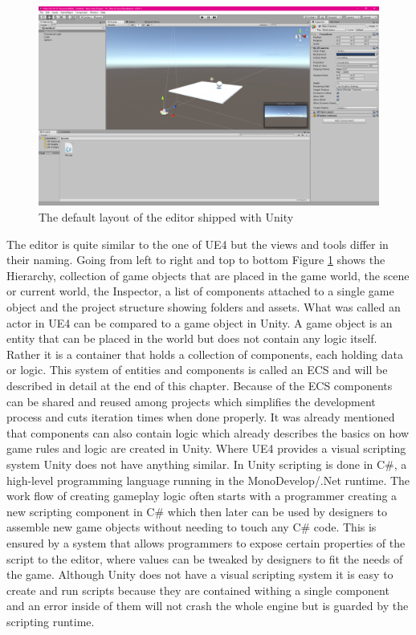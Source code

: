 \begin{figure}[h!]
	\includegraphics[width=\linewidth]{PICs/unity_ed.png}
	\caption{The default layout of the editor shipped with Unity}
	\label{fig:unity_ed}
\end{figure}

The editor is quite similar to the one of \ac{UE4} but the views and tools differ in their naming. Going from left to right and top to bottom Figure \ref{fig:unity_ed} shows the Hierarchy, collection of game objects that are placed in the game world, the scene or current world, the Inspector, a list of components attached to a single game object and the project structure showing folders and assets. 
What was called an actor in \ac{UE4} can be compared to a game object in Unity. A game object is an entity that can be placed in the world but does not contain any logic itself. Rather it is a container that holds a collection of components, each holding data or logic. This system of entities and components is called an \acl{ECS} and will be described in detail at the end of this chapter. Because of the \ac{ECS} components can be shared and reused among projects which simplifies the development process and cuts iteration times when done properly.
It was already mentioned that components can also contain logic which already describes the basics on how game rules and logic are created in Unity. Where \ac{UE4} provides a visual scripting system Unity does not have anything similar. In Unity scripting is done in C\#, a high-level programming language running in the MonoDevelop/.Net runtime. The work flow of creating gameplay logic often starts with a programmer creating a new scripting component in C\# which then later can be used by designers to assemble new game objects without needing to touch any C\# code. This is ensured by a system that allows programmers to expose certain properties of the script to the editor, where values can be tweaked by designers to fit the needs of the game. Although Unity does not have a visual scripting system it is easy to create and run scripts because they are contained withing a single component and an error inside of them will not crash the whole engine but is guarded by the scripting runtime.

